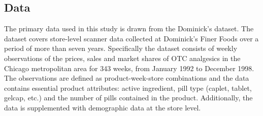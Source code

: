 \documentclass[12pt, authoryear]{elsarticle}
\begin{document}
\begin{table}[H]
	\caption{Market Shares by Firms, Products and Active Ingredients}
	\label{mshare}
\end{table}
\pagebreak


\subsection{Data}

The primary data used in this study is drawn from the Dominick's dataset. The dataset covers store-level scanner data collected at Dominick's Finer Foods over a period of more than seven years. Specifically the dataset consists of weekly observations of the prices, sales and market shares of OTC analgesics in the Chicago metropolitan area for 343 weeks, from January 1992 to December 1998. The observations are defined as product-week-store combinations and  the data contains essential product attributes: active ingredient, pill type (caplet, tablet, gelcap, etc.) and the number of pills contained in the product. Additionally, the data is supplemented with demographic data at the store level.
\end{document}
